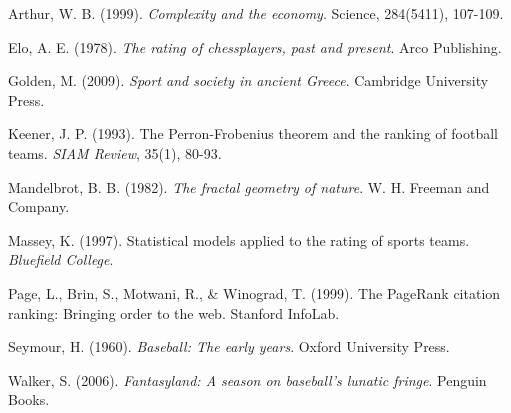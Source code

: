 \documentclass[11pt]{article}
\begin{document}

\begin{thebibliography}{99}

Arthur, W. B. (1999). \textit{Complexity and the economy}. Science, 284(5411), 107-109.

Elo, A. E. (1978). \textit{The rating of chessplayers, past and present}. Arco Publishing.

Golden, M. (2009). \textit{Sport and society in ancient Greece}. Cambridge University Press.

Keener, J. P. (1993). The Perron-Frobenius theorem and the ranking of football teams. \textit{SIAM Review}, 35(1), 80-93.

Mandelbrot, B. B. (1982). \textit{The fractal geometry of nature}. W. H. Freeman and Company.

Massey, K. (1997). Statistical models applied to the rating of sports teams. \textit{Bluefield College}.

Page, L., Brin, S., Motwani, R., \& Winograd, T. (1999). The PageRank citation ranking: Bringing order to the web. Stanford InfoLab.

Seymour, H. (1960). \textit{Baseball: The early years}. Oxford University Press.

Walker, S. (2006). \textit{Fantasyland: A season on baseball's lunatic fringe}. Penguin Books.

\end{thebibliography}
\end{document}
